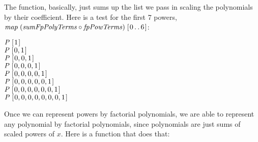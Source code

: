 \documentclass[tikz]{scrreprt}
\newcommand{\Conid}[1]{\mathit{#1}}
\newcommand{\Varid}[1]{\mathit{#1}}
\begin{document}
The function, basically, just sums up the list
we pass in scaling the polynomials by their coefficient.
Here is a test for the first 7 powers,\\
\ensuremath{\Varid{map}\;(\Varid{sumFpPolyTerms}\mathbin{\circ}\Varid{fpPowTerms})\;[\mskip1.5mu \mathrm{0}\mathinner{\ldotp\ldotp}\mathrm{6}\mskip1.5mu]}:

\begin{minipage}{\textwidth}
\begin{center}
\ensuremath{\Conid{P}\;[\mskip1.5mu \mathrm{1}\mskip1.5mu]}\\
\ensuremath{\Conid{P}\;[\mskip1.5mu \mathrm{0},\mathrm{1}\mskip1.5mu]}\\
\ensuremath{\Conid{P}\;[\mskip1.5mu \mathrm{0},\mathrm{0},\mathrm{1}\mskip1.5mu]}\\
\ensuremath{\Conid{P}\;[\mskip1.5mu \mathrm{0},\mathrm{0},\mathrm{0},\mathrm{1}\mskip1.5mu]}\\
\ensuremath{\Conid{P}\;[\mskip1.5mu \mathrm{0},\mathrm{0},\mathrm{0},\mathrm{0},\mathrm{1}\mskip1.5mu]}\\
\ensuremath{\Conid{P}\;[\mskip1.5mu \mathrm{0},\mathrm{0},\mathrm{0},\mathrm{0},\mathrm{0},\mathrm{1}\mskip1.5mu]}\\
\ensuremath{\Conid{P}\;[\mskip1.5mu \mathrm{0},\mathrm{0},\mathrm{0},\mathrm{0},\mathrm{0},\mathrm{0},\mathrm{1}\mskip1.5mu]}\\
\ensuremath{\Conid{P}\;[\mskip1.5mu \mathrm{0},\mathrm{0},\mathrm{0},\mathrm{0},\mathrm{0},\mathrm{0},\mathrm{0},\mathrm{1}\mskip1.5mu]}
\end{center}
\end{minipage}

Once we can represent powers by factorial polynomials,
we are able to represent any polynomial by factorial polynomials,
since polynomials are just sums of scaled powers of $x$.
Here is a function that does that:
\end{document}
